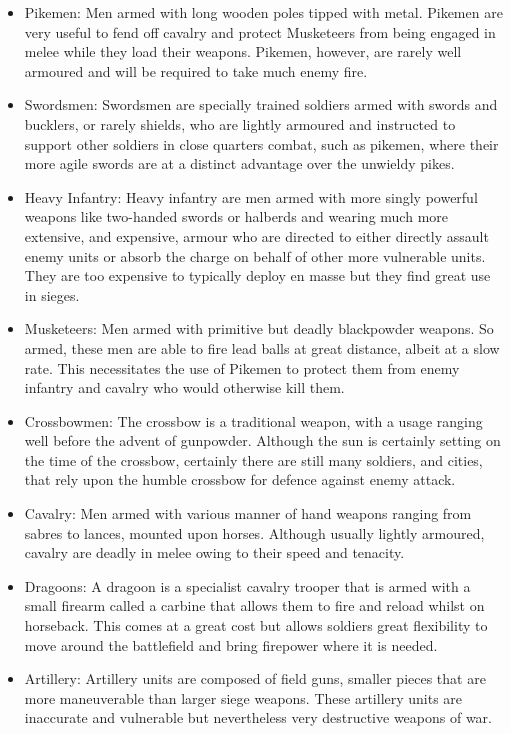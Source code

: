 \documentclass{article}
\begin{document}
\begin{itemize}
\item Pikemen: Men armed with long wooden poles tipped with metal. Pikemen are very useful to fend off cavalry and protect Musketeers from being engaged in melee while they load their weapons. Pikemen, however, are rarely well armoured and will be required to take much enemy fire.
\item Swordsmen: Swordsmen are specially trained soldiers armed with swords and bucklers, or rarely shields, who are lightly armoured and instructed to support other soldiers in close quarters combat, such as pikemen, where their more agile swords are at a distinct advantage over the unwieldy pikes.  
\item Heavy Infantry: Heavy infantry are men armed with more singly powerful weapons like two-handed swords or halberds and wearing much more extensive, and expensive, armour who are directed to either directly assault enemy units or absorb the charge on behalf of other more vulnerable units. They are too expensive to typically deploy en masse but they find great use in sieges.
\item Musketeers: Men armed with primitive but deadly blackpowder weapons. So armed, these men are able to fire lead balls at great distance, albeit at a slow rate. This necessitates the use of Pikemen to protect them from enemy infantry and cavalry who would otherwise kill them.
\item Crossbowmen: The crossbow is a traditional weapon, with a usage ranging well before the advent of gunpowder. Although the sun is certainly setting on the time of the crossbow, certainly there are still many soldiers, and cities, that rely upon the humble crossbow for defence against enemy attack.
\item Cavalry: Men armed with various manner of hand weapons ranging from sabres to lances, mounted upon horses. Although usually lightly armoured, cavalry are deadly in melee owing to their speed and tenacity.
\item Dragoons: A dragoon is a specialist cavalry trooper that is armed with a small firearm called a carbine that allows them to fire and reload whilst on horseback. This comes at a great cost but allows soldiers great flexibility to move around the battlefield and bring firepower where it is needed.
\item Artillery: Artillery units are composed of field guns, smaller pieces that are more maneuverable than larger siege weapons. These artillery units are inaccurate and vulnerable but nevertheless very destructive weapons of war.

\end{itemize}
\end{document}
